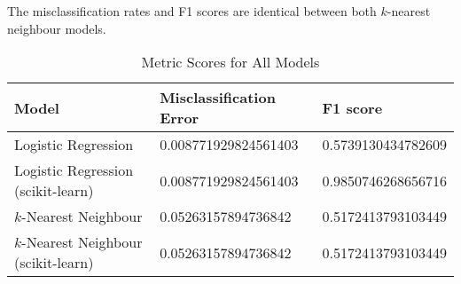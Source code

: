 \documentclass[12pt]{article}
\begin{document}
The misclassification rates and F1 scores are identical between both $k$-nearest neighbour models.

\begin{table}[htp]
\centering
\caption{Metric Scores for All Models}\label{tab:err}
\begin{tabular}{|l|l|l|}
	\hline
	Model	& Misclassification Error	& F1 score \\ \hline\hline
	Logistic Regression						& 0.008771929824561403	& 0.5739130434782609		\\ \hline
	Logistic Regression (scikit-learn)		& 0.008771929824561403	& 0.9850746268656716	\\ \hline
	$k$-Nearest Neighbour					& 0.05263157894736842	& 0.5172413793103449	\\ \hline
	$k$-Nearest Neighbour (scikit-learn)	& 0.05263157894736842	& 0.5172413793103449	\\ \hline
\end{tabular}
\end{table}

% 
\end{document}
